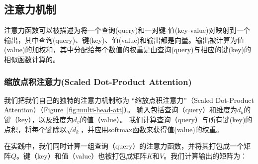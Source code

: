 \subsection{注意力机制} \label{sec:attention}

注意力函数可以被描述为将一个查询(query)和一对键-值(key-value)对映射到一个输出，其中查询(query)、键(key)、值(value)和输出都是向量。输出被计算为值(value)的加权和，其中分配给每个数值的权重是由查询(query)与相应的键(key)的相似函数计算的。

\subsubsection{缩放点积注意力(Scaled Dot-Product Attention)} \label{sec:scaled-dot-prod}



我们把我们自己的独特的注意力机制称为 “缩放点积注意力”（Scaled Dot-Product Attention）（Figure~\ref{fig:multi-head-att}）。 输入包括查询（query）和维度为$d_k$的键（key），以及维度为$d_v$的值（value）。 我们计算查询（query）与所有键(key)的点积，将每个键除以$\sqrt{d_k}$，并应用softmax函数来获得值(value)的权重。


在实践中，我们同时计算一组查询（query）的注意力函数，并将其打包成一个矩阵$Q$。键（key）和值（value）也被打包成矩阵$K$和$V$。我们计算输出的矩阵为：

